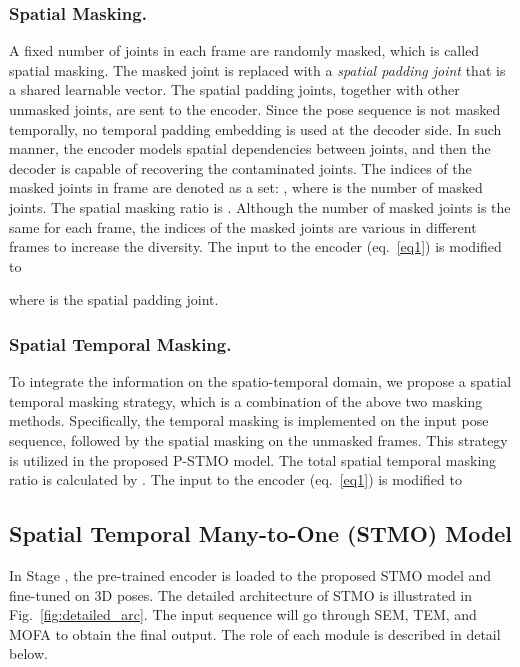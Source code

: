 \documentclass[]{llncs}
\newcommand{\RNum}[1]{\uppercase\expandafter{\romannumeral #1\relax}}
\begin{document}
\subsubsection{Spatial Masking.}
A fixed number of joints in each frame are randomly masked, which is called spatial masking. The masked joint is replaced with a \textit{spatial padding joint}  that is a shared learnable vector. The spatial padding joints, together with other unmasked joints, are sent to the encoder. Since the pose sequence is not masked temporally, no temporal padding embedding is used at the decoder side. In such manner, the encoder models spatial dependencies between joints, and then the decoder is capable of recovering the contaminated joints. The indices of the masked joints in frame  are denoted as a set: , where  is the number of masked joints. The spatial masking ratio is . Although the number of masked joints is the same for each frame, the indices of the masked joints are various in different frames to increase the diversity. The input  to the encoder (eq.~\ref{eq1}) is modified to

where  is the spatial padding joint. 

\subsubsection{Spatial Temporal Masking.}
To integrate the information on the spatio-temporal domain, we propose a spatial temporal masking strategy, which is a combination of the above two masking methods. Specifically, the temporal masking is implemented on the input pose sequence, followed by the spatial masking on the unmasked frames. This strategy is utilized in the proposed P-STMO model. The total spatial temporal masking ratio is calculated by . The input  to the encoder (eq.~\ref{eq1}) is modified to 



\subsection{Spatial Temporal Many-to-One (STMO) Model}
In Stage \RNum{2}, the pre-trained encoder is loaded to the proposed STMO model and fine-tuned on 3D poses. The detailed architecture of STMO is illustrated in Fig.~\ref{fig:detailed_arc}. The input sequence will go through SEM, TEM, and MOFA to obtain the final output. The role of each module is described in detail below.
\end{document}
